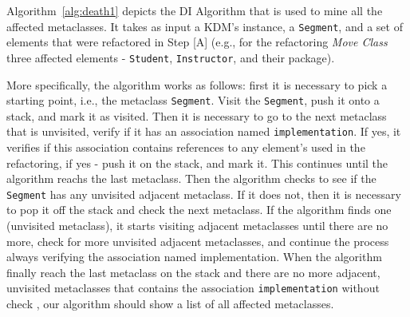 Algorithm~\ref{alg:death1} depicts the DI Algorithm that is used to mine all the affected metaclasses. It takes as input a KDM's instance, a \texttt{Segment}, and a set of elements that were refactored in Step [A] (e.g., for the refactoring \textit{Move Class} three affected elements - \texttt{Student}, \texttt{Instructor}, and their package). %

More specifically, the algorithm works as follows: first it is necessary to pick a starting point, i.e., the metaclass \texttt{Segment}. Visit the \texttt{Segment}, push it onto a stack, and mark it as visited. Then it is necessary to go to the next metaclass that is unvisited, verify if it has an association named \texttt{implementation}. If yes, it verifies if this association contains references to any element's used in the refactoring, if yes - push it on the stack, and mark it. This continues until the algorithm reachs the last metaclass. Then the algorithm checks to see if the \texttt{Segment} has any unvisited adjacent metaclass. If it does not, then it is necessary to pop it off the stack and check the next metaclass. If the algorithm finds one (unvisited metaclass), it starts visiting adjacent metaclasses until there are no more, check for more unvisited adjacent metaclasses, and continue the process always verifying the association named implementation. When the algorithm finally reach the last metaclass on the stack and there are no more adjacent, unvisited metaclasses that contains the association \texttt{implementation} without check , our algorithm should show a list of all affected metaclasses. 
%
%
%
%
%
%
%
%
%












